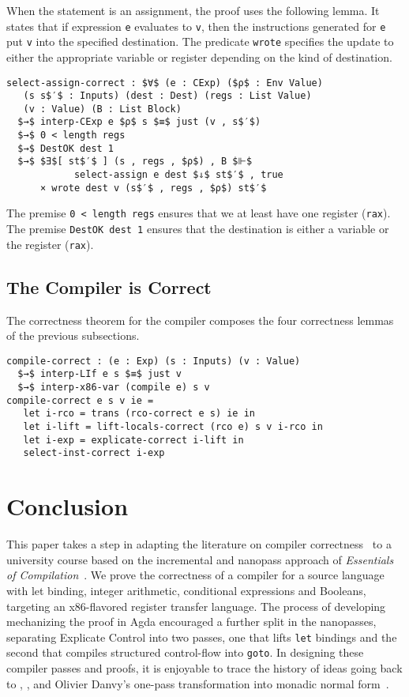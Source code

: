 \documentclass[sigplan,review,dvipsnames,screen,10pt]{acmart}
\begin{document}
When the statement is an assignment, the proof uses the following
lemma. It states that if expression \lstinline{e} evaluates to
\lstinline{v}, then the instructions generated for \lstinline{e} put
\lstinline{v} into the specified destination. The predicate
\lstinline{wrote} specifies the update to either the appropriate
variable or register depending on the kind of destination.

\begin{lstlisting}
select-assign-correct : $∀$ (e : CExp) ($ρ$ : Env Value)
   (s s$′$ : Inputs) (dest : Dest) (regs : List Value)
   (v : Value) (B : List Block) 
  $→$ interp-CExp e $ρ$ s $≡$ just (v , s$′$)
  $→$ 0 < length regs
  $→$ DestOK dest 1
  $→$ $∃$[ st$′$ ] (s , regs , $ρ$) , B $⊩$
            select-assign e dest $⇓$ st$′$ , true
      × wrote dest v (s$′$ , regs , $ρ$) st$′$
\end{lstlisting}

\noindent The premise \lstinline{0 < length regs} ensures that we at
least have one register (\lstinline{rax}). The premise
\lstinline{DestOK dest 1} ensures that the destination is either a
variable or the register (\lstinline{rax}).

\subsection{The Compiler is Correct}

The correctness theorem for the compiler composes the four correctness
lemmas of the previous subsections.

\begin{lstlisting}
compile-correct : (e : Exp) (s : Inputs) (v : Value)
  $→$ interp-LIf e s $≡$ just v
  $→$ interp-x86-var (compile e) s v
compile-correct e s v ie =
   let i-rco = trans (rco-correct e s) ie in
   let i-lift = lift-locals-correct (rco e) s v i-rco in
   let i-exp = explicate-correct i-lift in
   select-inst-correct i-exp
\end{lstlisting}


\section{Conclusion}
\label{sec:conclusion}

This paper takes a step in adapting the literature on compiler
correctness~\citep{Leroy:2006fe,Kumar:2014aa} to a university course
based on the incremental and nanopass approach of \emph{Essentials of
Compilation}~\citep{Siek:2023tr,Siek:2023ue}. We prove the correctness
of a compiler for a source language with let binding, integer
arithmetic, conditional expressions and Booleans, targeting an
x86-flavored register transfer language. The process of developing
mechanizing the proof in Agda encouraged a further split in the
nanopasses, separating Explicate Control into two passes, one that
lifts \lstinline{let} bindings and the second that compiles structured
control-flow into \lstinline{goto}. In designing these compiler passes
and proofs, it is enjoyable to trace the history of ideas going back
to \citet{Aho:1986qf}, \citet{Dybvig:1990aa}, and Olivier Danvy's
one-pass transformation into monadic normal form~\citep{Danvy:2003fk}.






\end{document}
